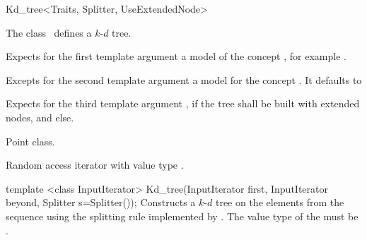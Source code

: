 

\begin{ccRefClass}{Kd_tree<Traits, Splitter, UseExtendedNode>}  %


\ccDefinition  
The class \ccRefName\ defines a $k$-$d$ tree.


\ccParameters

Expects for the first template argument a model of the concept
, for example .

Excepts for the second template argument a model for the concept .
It defaults  to 

Expects for the third template argument , if the 
tree shall be built with extended nodes, and  else.

\ccTypes

 {Point class.}


\begin{ccAdvanced}
 {Random access iterator 
with value type .}
\end{ccAdvanced}

\ccCreation
{}

\ccConstructor
{template <class InputIterator> Kd_tree(InputIterator first, InputIterator beyond, Splitter s=Splitter());}
{
Constructs a $k$-$d$ tree on the elements from the sequence 
\ccc{[first, beyond)} using the splitting rule implemented by . 
The value type of the  must be .
}


\end{ccRefClass}

